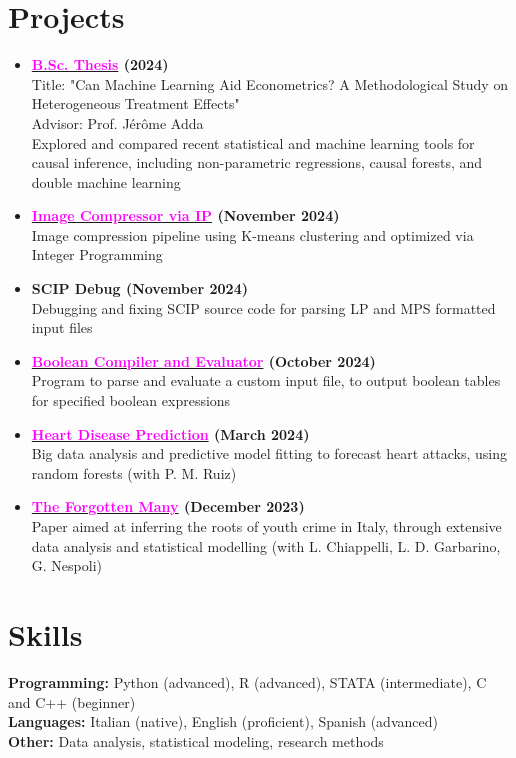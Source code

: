 \documentclass[letterpaper,11pt]{article}
\newcommand{\resumeProjectItem}[2]{
  \item
  \textbf{\color{black}\small #1} \\
  {\footnotesize #2}
  \vspace{0.05cm}
}
\newcommand{\resumeSubHeadingListStart}{\begin{itemize}[leftmargin=0in, label={}]}
\newcommand{\resumeSubHeadingListEnd}{\end{itemize}}
\begin{document}
\section{Projects}
\resumeSubHeadingListStart
\resumeProjectItem{\href{https://matildedol.github.io/files/bscthesis.pdf}{\textcolor{magenta}{B.Sc. Thesis}} (2024)}{
    Title: "Can Machine Learning Aid Econometrics? A Methodological Study on Heterogeneous Treatment Effects" \\
    Advisor: Prof. Jérôme Adda \\
    Explored and compared recent statistical and machine learning tools for causal inference, including non-parametric regressions, causal forests, and double machine learning
}

\resumeProjectItem{\href{https://github.com/matildedol/algorithms-bocconi/tree/main/image-compression-IP}{\textcolor{magenta}{Image Compressor via IP}} (November 2024)}{
    Image compression pipeline using K-means clustering and optimized via Integer Programming 
}
 \resumeProjectItem{SCIP Debug (November 2024)}{
     Debugging and fixing SCIP source code for parsing LP and MPS formatted input files
 }
\resumeProjectItem{\href{https://github.com/matildedol/software-eng-bocconi/tree/main/boolean-compiler}{\textcolor{magenta}{Boolean Compiler and Evaluator}}
(October 2024)}{
    Program to parse and evaluate a custom input file, to output boolean tables for specified boolean expressions
}
\resumeProjectItem{\href{https://matildedol.github.io/files/pred_heart_disease.pdf}{\textcolor{magenta}{Heart Disease Prediction}} (March 2024)}{
    Big data analysis and predictive model fitting to forecast heart attacks, using random forests (with P. M. Ruiz) 
}
\resumeProjectItem{\href{https://matildedol.github.io/files/the_forgotten_many.pdf}{\textcolor{magenta}{The Forgotten Many}} (December 2023)}{
    Paper aimed at inferring the roots of youth crime in Italy, through extensive data analysis and statistical modelling (with L. Chiappelli, L. D. Garbarino, G. Nespoli) 
}
\resumeSubHeadingListEnd
\vspace*{-0.4cm}
\section{Skills}
\small
\textbf{Programming:} Python (advanced), R (advanced), STATA (intermediate), C and C++ (beginner) \\
\textbf{Languages:}  Italian (native), English (proficient), Spanish (advanced) \\
\textbf{Other:} Data analysis, statistical modeling, research methods
\end{document}
